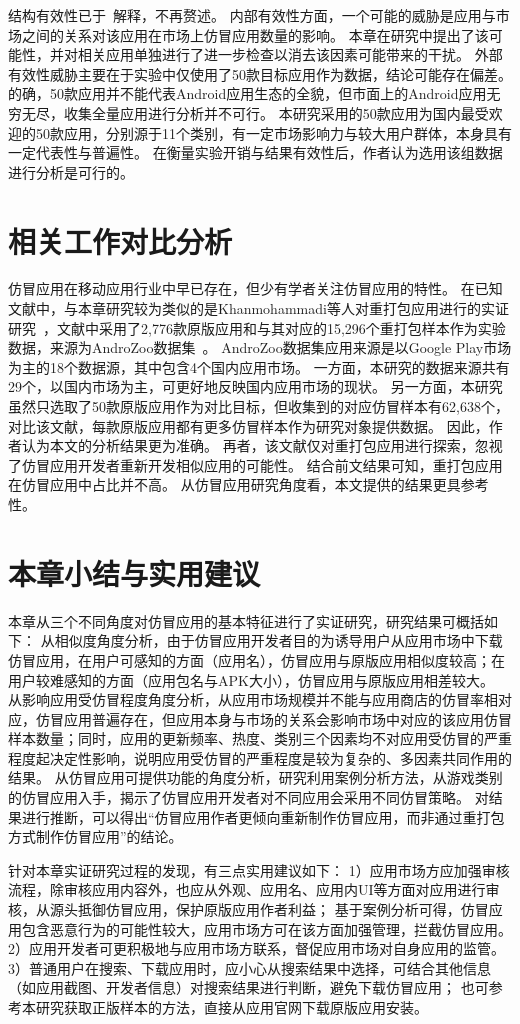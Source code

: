 结构有效性已于~解释，不再赘述。
内部有效性方面，一个可能的威胁是应用与市场之间的关系对该应用在市场上仿冒应用数量的影响。
本章在研究中提出了该可能性，并对相关应用单独进行了进一步检查以消去该因素可能带来的干扰。
外部有效性威胁主要在于实验中仅使用了50款目标应用作为数据，结论可能存在偏差。
的确，50款应用并不能代表Android应用生态的全貌，但市面上的Android应用无穷无尽，收集全量应用进行分析并不可行。
本研究采用的50款应用为国内最受欢迎的50款应用，分别源于11个类别，有一定市场影响力与较大用户群体，本身具有一定代表性与普遍性。
在衡量实验开销与结果有效性后，作者认为选用该组数据进行分析是可行的。

\section{相关工作对比分析}

仿冒应用在移动应用行业中早已存在，但少有学者关注仿冒应用的特性。
在已知文献中，与本章研究较为类似的是Khanmohammadi等人对重打包应用进行的实证研究~\cite{khanmohammadi2019empirical}，文献中采用了2,776款原版应用和与其对应的15,296个重打包样本作为实验数据，来源为AndroZoo数据集~\cite{li2017androzoo++}。
AndroZoo数据集应用来源是以Google Play市场为主的18个数据源，其中包含4个国内应用市场。
一方面，本研究的数据来源共有29个，以国内市场为主，可更好地反映国内应用市场的现状。
另一方面，本研究虽然只选取了50款原版应用作为对比目标，但收集到的对应仿冒样本有62,638个，对比该文献，每款原版应用都有更多仿冒样本作为研究对象提供数据。
因此，作者认为本文的分析结果更为准确。
再者，该文献仅对重打包应用进行探索，忽视了仿冒应用开发者重新开发相似应用的可能性。
结合前文结果可知，重打包应用在仿冒应用中占比并不高。
从仿冒应用研究角度看，本文提供的结果更具参考性。


\section{本章小结与实用建议}

本章从三个不同角度对仿冒应用的基本特征进行了实证研究，研究结果可概括如下：
从相似度角度分析，由于仿冒应用开发者目的为诱导用户从应用市场中下载仿冒应用，在用户可感知的方面（应用名），仿冒应用与原版应用相似度较高；在用户较难感知的方面（应用包名与APK大小），仿冒应用与原版应用相差较大。
从影响应用受仿冒程度角度分析，从应用市场规模并不能与应用商店的仿冒率相对应，仿冒应用普遍存在，但应用本身与市场的关系会影响市场中对应的该应用仿冒样本数量；同时，应用的更新频率、热度、类别三个因素均不对应用受仿冒的严重程度起决定性影响，说明应用受仿冒的严重程度是较为复杂的、多因素共同作用的结果。
从仿冒应用可提供功能的角度分析，研究利用案例分析方法，从游戏类别的仿冒应用入手，揭示了仿冒应用开发者对不同应用会采用不同仿冒策略。
对结果进行推断，可以得出``仿冒应用作者更倾向重新制作仿冒应用，而非通过重打包方式制作仿冒应用''的结论。

针对本章实证研究过程的发现，有三点实用建议如下：
1）应用市场方应加强审核流程，除审核应用内容外，也应从外观、应用名、应用内UI等方面对应用进行审核，从源头抵御仿冒应用，保护原版应用作者利益；
基于案例分析可得，仿冒应用包含恶意行为的可能性较大，应用市场方可在该方面加强管理，拦截仿冒应用。
2）应用开发者可更积极地与应用市场方联系，督促应用市场对自身应用的监管。
3）普通用户在搜索、下载应用时，应小心从搜索结果中选择，可结合其他信息（如应用截图、开发者信息）对搜索结果进行判断，避免下载仿冒应用；
也可参考本研究获取正版样本的方法，直接从应用官网下载原版应用安装。
